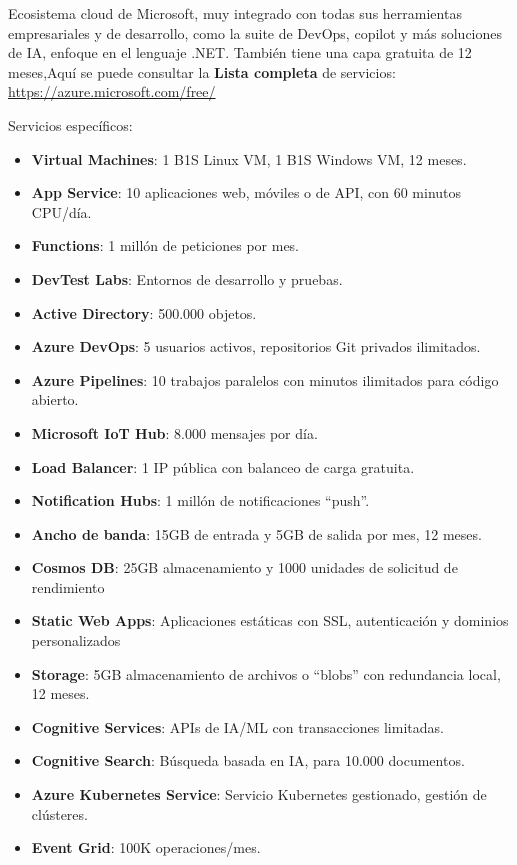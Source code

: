 Ecosistema cloud de Microsoft, muy integrado con todas sus herramientas empresariales y de desarrollo, como la suite de DevOps, copilot y más soluciones de IA, enfoque en el lenguaje .NET. También tiene una capa gratuita de 12 meses,Aquí se puede consultar la \textbf{Lista completa} de servicios: \url{https://azure.microsoft.com/free/}

Servicios específicos:
\begin{itemize}
	\item \textbf{Virtual Machines}: 1 B1S Linux VM, 1 B1S Windows VM, 12 meses.
	\item \textbf{App Service}: 10 aplicaciones web, móviles o de API, con 60 minutos CPU/día.
	\item \textbf{Functions}: 1 millón de peticiones por mes.
	\item \textbf{DevTest Labs}: Entornos de desarrollo y pruebas.
	\item \textbf{Active Directory}: 500.000 objetos.
	\item \textbf{Azure DevOps}: 5 usuarios activos, repositorios Git privados ilimitados.
	\item \textbf{Azure Pipelines}: 10 trabajos paralelos con minutos ilimitados para código abierto.
	\item \textbf{Microsoft IoT Hub}: 8.000 mensajes por día.
	\item \textbf{Load Balancer}: 1 IP pública con balanceo de carga gratuita.
	\item \textbf{Notification Hubs}: 1 millón de notificaciones ``push''.
	\item \textbf{Ancho de banda}: 15GB de entrada y 5GB de salida por mes, 12 meses.
	\item \textbf{Cosmos DB}: 25GB almacenamiento y 1000 unidades de solicitud de rendimiento
	\item \textbf{Static Web Apps}: Aplicaciones estáticas con SSL, autenticación y dominios personalizados
	\item \textbf{Storage}: 5GB almacenamiento de archivos o ``blobs'' con redundancia local, 12 meses.
	\item \textbf{Cognitive Services}: APIs de IA/ML con transacciones limitadas.
	\item \textbf{Cognitive Search}: Búsqueda basada en IA, para 10.000 documentos.
	\item \textbf{Azure Kubernetes Service}: Servicio Kubernetes gestionado, gestión de clústeres.
	\item \textbf{Event Grid}: 100K operaciones/mes.
\end{itemize}

